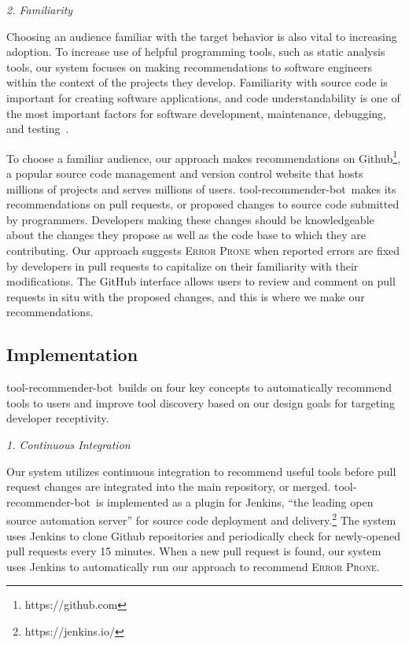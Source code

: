 \documentclass[conference]{IEEEtran}
\newcommand{\tool}{tool-recommender-bot}
\newcommand{\pseudosubsection}[1]{\vspace{2mm} {\it #1}}
\begin{document}
\pseudosubsection{2. Familiarity}

Choosing an audience familiar with the target behavior is also vital to increasing adoption. To increase use of helpful programming tools, such as static analysis tools, our system focuses on making recommendations to software engineers within the context of the projects they develop. Familiarity with source code is important for creating software applications, and code understandability is one of the most important factors for software development, maintenance, debugging, and testing~\cite{Understandability}.

To choose a familiar audience, our approach makes recommendations on Github\footnote{https://github.com}, a popular source code management and version control website that hosts millions of projects and serves millions of users. \tool~makes its recommendations on pull requests, or proposed changes to source code submitted by programmers. Developers making these changes should be knowledgeable about the changes they propose as well as the code base to which they are contributing. Our approach suggests \textsc{Error Prone} when reported errors are fixed by developers in pull requests to capitalize on their familiarity with their modifications. The GitHub interface allows users to review and comment on pull requests in situ with the proposed changes, and this is where we make our recommendations.

\subsection{Implementation}

\tool~builds on four key concepts to automatically recommend tools to users and improve tool discovery based on our design goals for targeting developer receptivity.

\pseudosubsection{1. Continuous Integration}

Our system utilizes continuous integration to recommend useful tools before pull request changes are integrated into the main repository, or merged. \tool~is implemented as a plugin for Jenkins, ``the leading open source automation server'' for source code deployment and delivery.\footnote{https://jenkins.io/} The system uses Jenkins to clone Github repositories and periodically check for newly-opened pull requests every 15 minutes. When a new pull request is found, our system uses Jenkins to automatically run our approach to recommend \textsc{Error Prone}.
\end{document}
